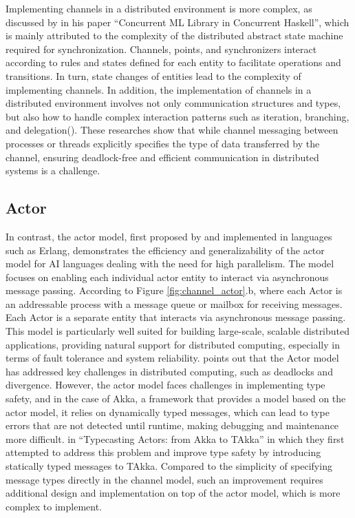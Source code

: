 \documentclass{l4proj}
\begin{document}
Implementing channels in a distributed environment is more complex, as discussed by \cite{chaudhuri_2009_a} in his paper “Concurrent ML Library in Concurrent Haskell”, which is mainly attributed to the complexity of the distributed abstract state machine required for synchronization. Channels, points, and synchronizers interact according to rules and states defined for each entity to facilitate operations and transitions. In turn, state changes of entities lead to the complexity of implementing channels. In addition, the implementation of channels in a distributed environment involves not only communication structures and types, but also how to handle complex interaction patterns such as iteration, branching, and delegation(\cite{hu_sessionbased}). These researches show that while channel messaging between processes or threads explicitly specifies the type of data transferred by the channel, ensuring deadlock-free and efficient communication in distributed systems is a challenge.


\subsection{Actor}
In contrast, the actor model, first proposed by \cite{hewitt_a} and implemented in languages such as Erlang, demonstrates the efficiency and generalizability of the actor model for AI languages dealing with the need for high parallelism. The model focuses on enabling each individual actor entity to interact via asynchronous message passing. According to Figure \ref{fig:channel_actor}.b, where each Actor is an addressable process with a message queue or mailbox for receiving messages. Each Actor is a separate entity that interacts via asynchronous message passing. This model is particularly well suited for building large-scale, scalable distributed applications, providing natural support for distributed computing, especially in terms of fault tolerance and system reliability. \cite{agha_1985_actors} points out that the Actor model has addressed key challenges in distributed computing, such as deadlocks and divergence. However, the actor model faces challenges in implementing type safety, and in the case of Akka, a framework that provides a model based on the actor model, it relies on dynamically typed messages, which can lead to type errors that are not detected until runtime, making debugging and maintenance more difficult. \cite{he_2014_typecasting} in “Typecasting Actors: from Akka to TAkka” in which they first attempted to address this problem and improve type safety by introducing statically typed messages to TAkka. Compared to the simplicity of specifying message types directly in the channel model, such an improvement requires additional design and implementation on top of the actor model, which is more complex to implement.
\end{document}
